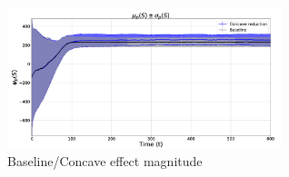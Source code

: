 \documentclass[preprint,12pt]{elsarticle}
\begin{document}
\begin{figure}
\begin{center}
\includegraphics[width=8cm]{figures/BaselineConcaveEffectMag}
\end{center}
\caption{Baseline/Concave effect magnitude\label{concave:BaselineConcaveEffectMag}}
\end{figure}
\end{document}
